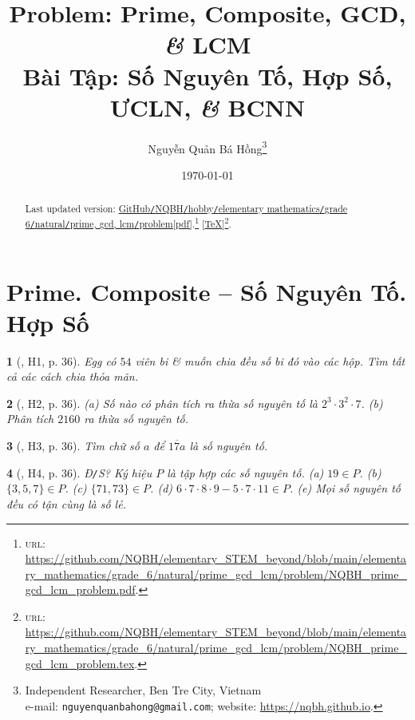 \documentclass{article}
\title{Problem: Prime, Composite, GCD, {\it\&} LCM\\Bài Tập: Số Nguyên Tố, Hợp Số, ƯCLN, {\it\&} BCNN}
\author{Nguyễn Quản Bá Hồng\footnote{Independent Researcher, Ben Tre City, Vietnam\\e-mail: \texttt{nguyenquanbahong@gmail.com}; website: \url{https://nqbh.github.io}.}}
\date{\today}
\newtheorem{baitoan}{}
\begin{document}
\maketitle
\begin{abstract}
	Last updated version: \href{https://github.com/NQBH/elementary_STEM_beyond/blob/main/elementary_mathematics/grade_6/natural/prime_gcd_lcm/problem/NQBH_prime_gcd_lcm_problem.pdf}{GitHub{\tt/}NQBH{\tt/}hobby{\tt/}elementary mathematics{\tt/}grade 6{\tt/}natural{\tt/}prime, gcd, lcm{\tt/}problem[pdf]}.\footnote{\textsc{url}: \url{https://github.com/NQBH/elementary_STEM_beyond/blob/main/elementary_mathematics/grade_6/natural/prime_gcd_lcm/problem/NQBH_prime_gcd_lcm_problem.pdf}.} [\href{https://github.com/NQBH/elementary_STEM_beyond/blob/main/elementary_mathematics/grade_6/natural/prime_gcd_lcm/problem/NQBH_prime_gcd_lcm_problem.tex}{\TeX}]\footnote{\textsc{url}: \url{https://github.com/NQBH/elementary_STEM_beyond/blob/main/elementary_mathematics/grade_6/natural/prime_gcd_lcm/problem/NQBH_prime_gcd_lcm_problem.tex}.}. 
\end{abstract}
\tableofcontents


\section{Prime. Composite -- Số Nguyên Tố. Hợp Số}

\begin{baitoan}[\cite{Binh_boi_duong_Toan_6_tap_1}, H1, p. 36]
	Egg có $54$ viên bi \& muốn chia đều số bi đó vào các hộp. Tìm tất cả các cách chia thỏa mãn.
\end{baitoan}

\begin{baitoan}[\cite{Binh_boi_duong_Toan_6_tap_1}, H2, p. 36]
	(a) Số nào có phân tích ra thừa số nguyên tố là $2^3\cdot3^2\cdot7$. (b) Phân tích $2160$ ra thừa số nguyên tố.
\end{baitoan}

\begin{baitoan}[\cite{Binh_boi_duong_Toan_6_tap_1}, H3, p. 36]
	Tìm chữ số $a$ để $\overline{17a}$ là số nguyên tố.
\end{baitoan}

\begin{baitoan}[\cite{Binh_boi_duong_Toan_6_tap_1}, H4, p. 36]
	{\rm Đ{\tt/}S?} Ký hiệu $P$ là tập hợp các số nguyên tố. (a) $19\in P$. (b) $\{3,5,7\}\in P$. (c) $\{71,73\}\in P$. (d) $6\cdot7\cdot8\cdot9 - 5\cdot7\cdot11\in P$. (e) Mọi số nguyên tố đều có tận cùng là số lẻ.
\end{baitoan}
\end{document}
